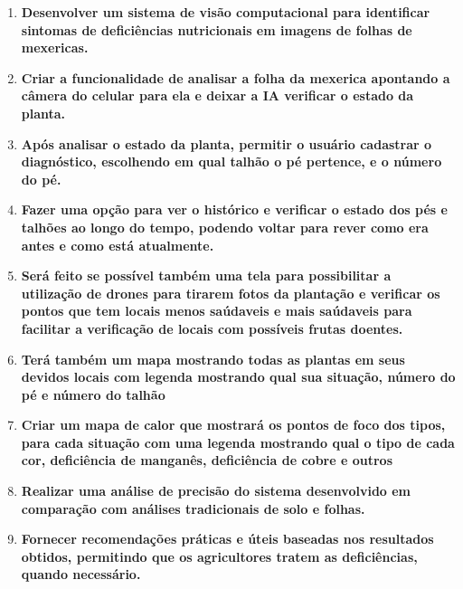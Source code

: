 \begin{enumerate} 
\item \textbf{Desenvolver um sistema de visão computacional para identificar sintomas de deficiências nutricionais em imagens de folhas de mexericas.}
\item \textbf{Criar a funcionalidade de analisar a folha da mexerica apontando a câmera do celular para ela e deixar a IA  verificar o estado da planta.}
\item \textbf{Após analisar o estado da planta, permitir o usuário cadastrar o diagnóstico, escolhendo em qual talhão o pé pertence, e o número do pé.} 
\item \textbf{Fazer uma opção para ver o histórico e verificar o estado dos pés e talhões ao longo do tempo, podendo voltar para rever como era antes e como está atualmente.}
\item \textbf{Será feito se possível também uma tela para possibilitar a utilização de drones para tirarem fotos da plantação e verificar os pontos que tem locais menos saúdaveis e mais saúdaveis para facilitar a verificação de locais
com possíveis frutas doentes.}
\item \textbf{Terá também um mapa mostrando todas as plantas em seus devidos locais com legenda mostrando qual sua situação, número do pé e número do talhão}
\item \textbf{Criar um mapa de calor que mostrará os pontos de foco dos tipos, para cada situação com uma legenda mostrando qual o tipo de cada cor, deficiência de manganês, deficiência de cobre e outros}
\item \textbf{Realizar uma análise de precisão do sistema desenvolvido em comparação com análises tradicionais de solo e folhas.} 
\item \textbf{Fornecer recomendações práticas e úteis baseadas nos resultados obtidos, permitindo que os agricultores tratem as deficiências, quando necessário.} \end{enumerate}